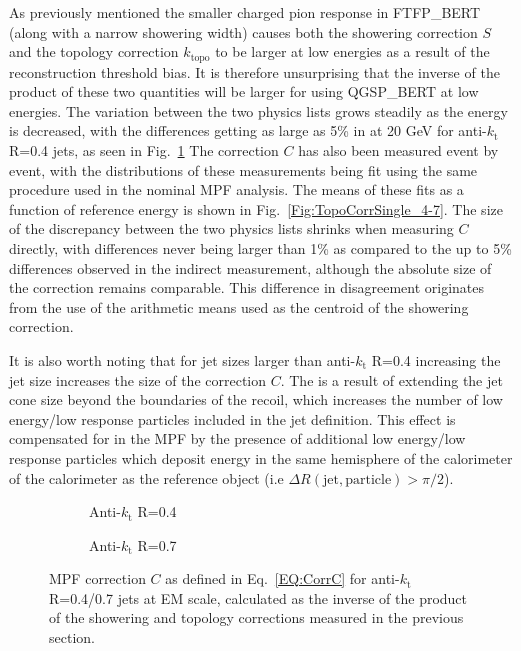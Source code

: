 As previously mentioned the smaller charged pion response in FTFP\_BERT (along with a narrow showering width) causes both the showering correction $S$ and the topology correction $k_{\mathrm{topo}}$ to be larger at low energies as a result of the reconstruction threshold bias.  
It is therefore unsurprising that the inverse of the product of these two quantities will be larger for using QGSP\_BERT at low energies.  
The variation between the two physics lists grows steadily as the energy is decreased, with the differences getting as large as 5\% in at 20 GeV for anti-$k_\mathrm{t}$ R=0.4 jets, as seen in Fig.~\ref{Fig:TopoCorr_4-7}
The correction $C$ has also been measured event by event, with the distributions of these measurements being fit using the same procedure used in the nominal MPF analysis.  
The means of these fits as a function of reference energy is shown in Fig.~\ref{Fig:TopoCorrSingle_4-7}.  
The size of the discrepancy between the two physics lists shrinks when measuring $C$ directly, with differences never being larger than 1\% as compared to the up to 5\% differences observed in the indirect measurement, although the absolute size of the correction remains comparable.  
This difference in disagreement originates from the use of the arithmetic means used as the centroid of the showering correction.  


It is also worth noting that for jet sizes larger than anti-$k_\mathrm{t}$ R=0.4 increasing the jet size increases the size of the correction $C$.  
The is a result of extending the jet cone size beyond the boundaries of the recoil, which increases the number of low energy/low response particles included in the jet definition.  
This effect is compensated for in the MPF by the presence of additional low energy/low response particles which deposit energy in the same hemisphere of the calorimeter of the calorimeter as the reference object (i.e $\Delta R\left(\mathrm{jet, particle}\right) > \pi/2$).  

\clearpage

\begin{figure}[!ht]
  \centering
  \begin{subfigure}{.5\textwidth}
    \centering
    \caption{Anti-$k_\mathrm{t}$ R=0.4}
  \end{subfigure}%
  \begin{subfigure}{.5\textwidth}  \centering
    \caption{Anti-$k_\mathrm{t}$ R=0.7}
  \end{subfigure}
  \caption[MPF Correction $C$ for anti-$k_\mathrm{t}$ R=0.4/0.7 jets]
{\small MPF correction $C$ as defined in Eq.~\ref{EQ:CorrC} for anti-$k_\mathrm{t}$ R=0.4/0.7 jets at EM scale, calculated as the inverse of the product of the showering and topology corrections measured in the previous section. }
  \label{Fig:TopoCorr_4-7}
\end{figure}




